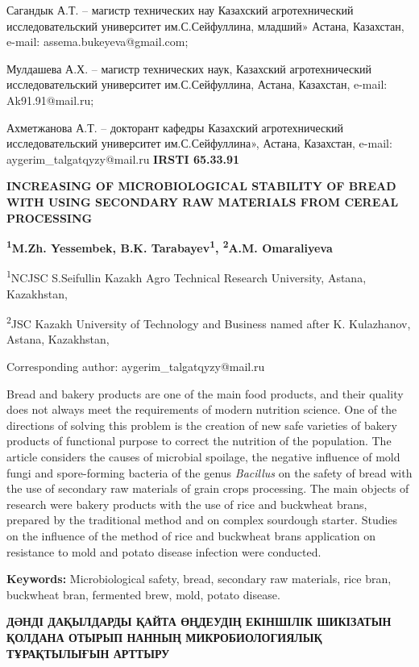Сагандык А.Т. -- магистр технических нау Казахский агротехнический
исследовательский университет им.С.Сейфуллина, младший» Астана,
Казахстан, e-mail: assema.bukeyeva@gmail.com;

Мулдашева А.Х. -- магистр технических наук, Казахский агротехнический
исследовательский университет им.С.Сейфуллина, Астана, Казахстан,
e-mail: Ak91.91@mail.ru;

Ахметжанова А.Т. -- докторант кафедры Казахский агротехнический
исследовательский университет им.С.Сейфуллина», Астана, Казахстан,
e-mail: aygerim\_talgatqyzy@mail.ru\newpage
{\bfseries IRSTI 65.33.91}

{\bfseries INCREASING OF MICROBIOLOGICAL STABILITY OF BREAD WITH USING
SECONDARY RAW MATERIALS FROM CEREAL PROCESSING}

{\bfseries \textsuperscript{1}M.Zh. Yessembek, B.K.
Tarabayev\textsuperscript{1}, \textsuperscript{2}A.M. Omaraliyeva}

\textsuperscript{1}NCJSC S.Seifullin Kazakh Agro Technical Research
University, Astana, Kazakhstan,

\textsuperscript{2}JSC Kazakh University of Technology and Business
named after K. Kulazhanov, Astana, Kazakhstan,

Corresponding author: aygerim\_talgatqyzy@mail.ru

Bread and bakery products are one of the main food products, and their
quality does not always meet the requirements of modern nutrition
science. One of the directions of solving this problem is the creation
of new safe varieties of bakery products of functional purpose to
correct the nutrition of the population. The article considers the
causes of microbial spoilage, the negative influence of mold fungi and
spore-forming bacteria of the genus \emph{Bacillus} on the safety of
bread with the use of secondary raw materials of grain crops processing.
The main objects of research were bakery products with the use of rice
and buckwheat brans, prepared by the traditional method and on complex
sourdough starter. Studies on the influence of the method of rice and
buckwheat brans application on resistance to mold and potato disease
infection were conducted.

{\bfseries Keywords:} Microbiological safety, bread, secondary raw
materials, rice bran, buckwheat bran, fermented brew, mold, potato
disease.

{\bfseries ДӘНДІ ДАҚЫЛДАРДЫ ҚАЙТА ӨҢДЕУДІҢ ЕКІНШІЛІК ШИКІЗАТЫН ҚОЛДАНА
ОТЫРЫП НАННЫҢ МИКРОБИОЛОГИЯЛЫҚ ТҰРАҚТЫЛЫҒЫН АРТТЫРУ}

